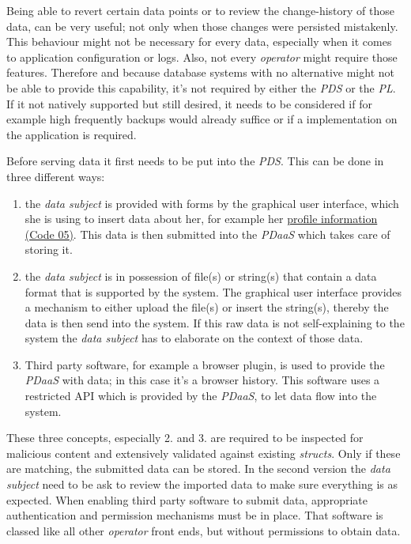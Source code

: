 \documentclass[12pt,english,a4paper,titlepage,cleardoublepage=empty,dottedtoc]{report}
\providecommand{\tightlist}{%
  \setlength{\itemsep}{0pt}\setlength{\parskip}{0pt}}
\begin{document}
Being able to revert certain data points or to review the change-history
of those data, can be very useful; not only when those changes were
persisted mistakenly. This behaviour might not be necessary for every
data, especially when it comes to application configuration or logs.
Also, not every \emph{operator} might require those features. Therefore
and because database systems with no alternative might not be able to
provide this capability, it's not required by either the \emph{PDS} or
the \emph{PL}. If it not natively supported but still desired, it needs
to be considered if for example high frequently backups would already
suffice or if a implementation on the application is required.

Before serving data it first needs to be put into the \emph{PDS}. This
can be done in three different ways:

\begin{enumerate}
\def\labelenumi{\arabic{enumi}.}
\tightlist
\item
  the \emph{data subject} is provided with forms by the graphical user
  interface, which she is using to insert data about her, for example
  her \protect\hyperlink{code-05_struct_profile}{profile information
  (Code 05)}. This data is then submitted into the \emph{PDaaS} which
  takes care of storing it.
\item
  the \emph{data subject} is in possession of file(s) or string(s) that
  contain a data format that is supported by the system. The graphical
  user interface provides a mechanism to either upload the file(s) or
  insert the string(s), thereby the data is then send into the system.
  If this raw data is not self-explaining to the system the \emph{data
  subject} has to elaborate on the context of those data.
\item
  Third party software, for example a browser plugin, is used to provide
  the \emph{PDaaS} with data; in this case it's a browser history. This
  software uses a restricted API which is provided by the \emph{PDaaS},
  to let data flow into the system.
\end{enumerate}

These three concepts, especially 2. and 3. are required to be inspected
for malicious content and extensively validated against existing
\emph{structs}. Only if these are matching, the submitted data can be
stored. In the second version the \emph{data subject} need to be ask to
review the imported data to make sure everything is as expected. When
enabling third party software to submit data, appropriate authentication
and permission mechanisms must be in place. That software is classed
like all other \emph{operator} front ends, but without permissions to
obtain data.
\end{document}
